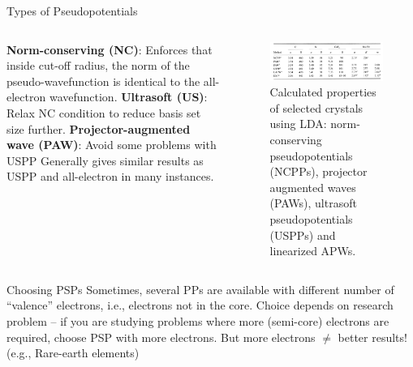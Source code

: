 \documentclass[aspectratio=169]{beamer}
\begin{document}
    \begin{frame}{Types of Pseudopotentials}

        \begin{columns}
            \textbf{Norm-conserving (NC)}: Enforces that inside cut-off radius, the norm of the pseudo-wavefunction is identical to the all-electron wavefunction.\newline
            \newline
            \textbf{Ultrasoft (US)}: Relax NC condition to reduce basis set size further.\newline
            \newline
            \textbf{Projector-augmented wave (PAW)}: Avoid some problems with USPP
            Generally gives similar results as USPP and all-electron in many instances.\cite{kresseUltrasoftPseudopotentialsProjector1999}
            \begin{figure}
                \centering
                \includegraphics[width=\linewidth]{lectures/figures/7_PSP_comparison.png}
                \caption{Calculated properties of selected crystals using LDA: norm-conserving pseudopotentials (NCPPs), projector augmented waves (PAWs), ultrasoft pseudopotentials (USPPs) and linearized APWs.}
            \end{figure}

        \end{columns}

    \end{frame}

    \begin{frame}{Choosing PSPs}
        Sometimes, several PPs are available with different number of ``valence'' electrons, i.e., electrons not in the core.\newline
        \newline
        Choice depends on research problem – if you are studying problems where more (semi-core) electrons are required, choose PSP with more electrons.\newline
        \newline
        But more electrons $\neq$ better results! (e.g., Rare-earth elements)

    \end{frame}
\end{document}
